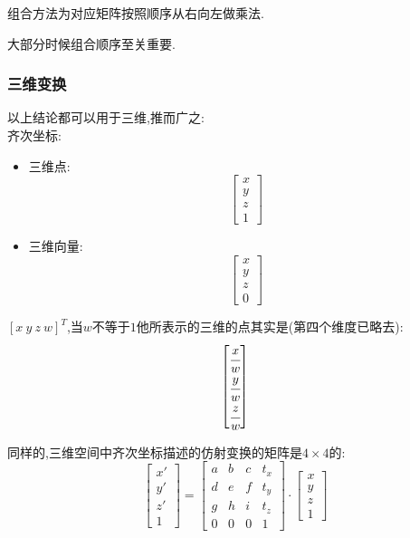 \documentclass[UTF8,12pt]{ctexbook}
\begin{document}
{{{{        组合方法为对应矩阵按照顺序从右向左做乘法.

        大部分时候组合顺序至关重要.

      }%

      \subsubsection{三维变换}{
        以上结论都可以用于三维,推而广之:\\

        齐次坐标:\begin{itemize}
          \item 三维点:$$\begin{bmatrix}
                    x \\
                    y \\
                    z \\
                    1
                  \end{bmatrix}$$
          \item 三维向量:$$\begin{bmatrix}
                    x \\
                    y \\
                    z \\
                    0
                  \end{bmatrix}$$
        \end{itemize}

        $\left[x\ y\ z\ w\right]^T$,当$w$不等于$1$他所表示的三维的点其实是(第四个维度已略去):
        $$\begin{bmatrix}
            \cfrac{x}{w} \\
            \cfrac{y}{w} \\
            \cfrac{z}{w} \\
          \end{bmatrix}$$

        同样的,三维空间中齐次坐标描述的仿射变换的矩阵是$4 \times 4$的:
        $$\begin{bmatrix}
            x\prime \\
            y\prime \\
            z\prime \\
            1
          \end{bmatrix}
          =
          \begin{bmatrix}
            a & b & c & t_x \\
            d & e & f & t_y \\
            g & h & i & t_z \\
            0 & 0 & 0 & 1
          \end{bmatrix}
          \cdot
          \begin{bmatrix}
            x \\
            y \\
            z \\
            1
          \end{bmatrix}$$

}}}}
\end{document}
